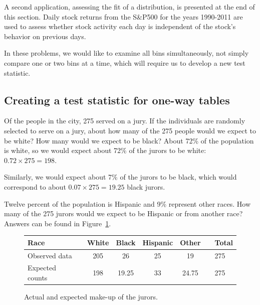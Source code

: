 A second application, assessing the fit of a distribution, is presented at the end of this section. Daily stock returns from the S\&P500 for the years 1990-2011 are used to assess whether stock activity each day is independent of the stock's behavior on previous days.

In these problems, we would like to examine all bins simultaneously, not simply compare one or two bins at a time, which will require us to develop a new test statistic.


\subsection{Creating a test statistic for one-way tables}

\begin{example}{Of the people in the city, 275 served on a jury. If the individuals are randomly selected to serve on a jury, about how many of the 275 people would we expect to be white? How many would we expect to be black?}
About 72\% of the population is white, so we would expect about 72\% of the jurors to be white: $0.72\times 275 = 198$.

Similarly, we would expect about 7\% of the jurors to be black, which would correspond to about $0.07\times 275 = 19.25$ black jurors.
\end{example}

\begin{exercise}
Twelve percent of the population is Hispanic and 9\% represent other races. How many of the 275 jurors would we expect to be Hispanic or from another race? Answers can be found in Figure~\ref{expectedJuryRepresentationIfNoBias}.
\end{exercise}

\begin{figure}[h]
\centering
\begin{tabular}{ll ccc c ll}
\hline
Race	 & \hspace{2mm} & White & Black & Hispanic & Other & \hspace{2mm} & Total \\
\hline
Observed data			&	& 205 & 26	& 25 & 19	&	& 275 \\
Expected counts	 &	& 198 & 19.25 & 33 & 24.75 & & 275 \\
\hline
\end{tabular}
\caption{Actual and expected make-up of the jurors.}
\label{expectedJuryRepresentationIfNoBias}
\end{figure}


